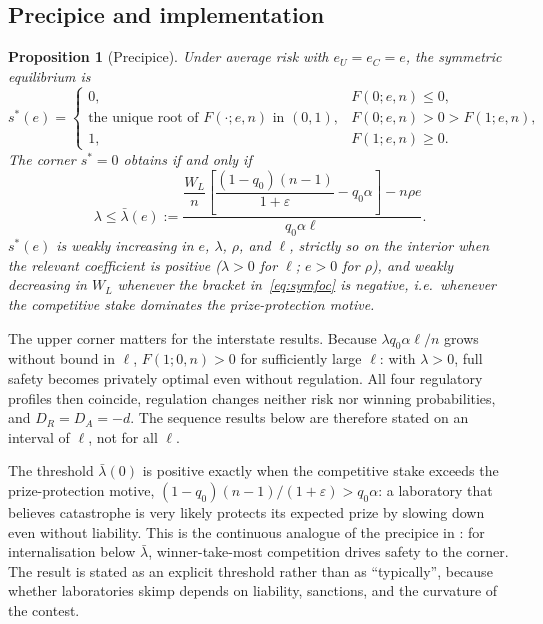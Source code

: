 \documentclass[11pt]{article}
\theoremstyle{plain}
\newtheorem{proposition}{Proposition}
\theoremstyle{definition}
\theoremstyle{remark}
\newcommand{\WL}{W_{\!L}}
\newcommand{\lbar}{\bar\lambda}
\begin{document}
\subsection{Precipice and implementation}

\begin{proposition}[Precipice]
Under average risk with $e_U=e_C=e$, the symmetric equilibrium is
\[
s^*(e)=\begin{cases}0,& F(0;e,n)\le0,\\ \text{the unique root of } F(\cdot;e,n)\text{ in }(0,1),& F(0;e,n)>0>F(1;e,n),\\ 1,& F(1;e,n)\ge0.\end{cases}
\]
The corner $s^*=0$ obtains if and only if
\begin{equation}
\lambda\le\lbar(e):=\frac{\dfrac{\WL}{n}\!\left[\dfrac{(1-q_0)(n-1)}{1+\varepsilon}-q_0\alpha\right]-n\rho e}{q_0\alpha\ell}.
\label{eq:lambdabar}
\end{equation}
$s^*(e)$ is weakly increasing in $e$, $\lambda$, $\rho$, and $\ell$, strictly so on the interior when the relevant coefficient is positive ($\lambda>0$ for $\ell$; $e>0$ for $\rho$), and weakly decreasing in $\WL$ whenever the bracket in~\eqref{eq:symfoc} is negative, i.e.\ whenever the competitive stake dominates the prize-protection motive.
\end{proposition}

The upper corner matters for the interstate results. Because $\lambda q_0\alpha\ell/n$ grows without bound in $\ell$, $F(1;0,n)>0$ for sufficiently large $\ell$: with $\lambda>0$, full safety becomes privately optimal even without regulation. All four regulatory profiles then coincide, regulation changes neither risk nor winning probabilities, and $D_R=D_A=-d$. The sequence results below are therefore stated on an interval of $\ell$, not for all $\ell$.

The threshold $\lbar(0)$ is positive exactly when the competitive stake exceeds the prize-protection motive, $(1-q_0)(n-1)/(1+\varepsilon)>q_0\alpha$: a laboratory that believes catastrophe is very likely protects its expected prize by slowing down even without liability. This is the continuous analogue of the precipice in \citet{armstrong2016}: for internalisation below $\lbar$, winner-take-most competition drives safety to the corner. The result is stated as an explicit threshold rather than as ``typically'', because whether laboratories skimp depends on liability, sanctions, and the curvature of the contest.
\end{document}
